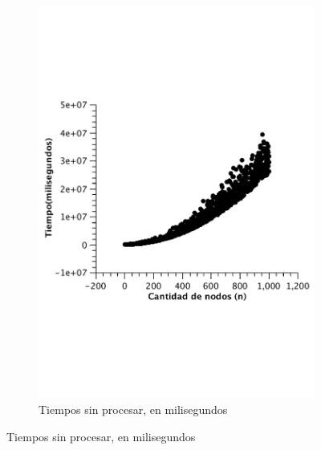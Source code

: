 \begin{figure}[H]
        \centering
\begin{subfigure}[b]{0.5\textwidth}
                \includegraphics[width=\textwidth]{imagenes/completo-matriz-1.pdf}
                \caption{Tiempos sin procesar, en milisegundos}
        \end{subfigure}%


\end{figure}
